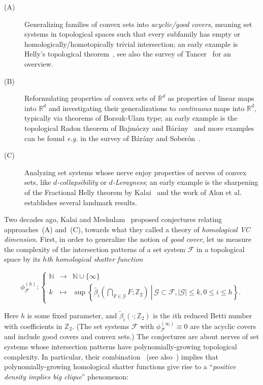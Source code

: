 \documentclass[a4paper,UKenglish,thm-restate]{article}
\newcommand{\R}{\mathbb{R}}
\newcommand{\Z}{\mathbb{Z}}
\newcommand{\F}{\mathcal{F}}
\newcommand{\G}{\mathcal{G}}
\newcommand{\defn}[1]{\emph{\color{violet}#1}}
\newcommand{\pth}[1]{\left(#1\right)}
\begin{document}
\begin{description}
\item[(A)] Generalizing families of convex sets into \emph{acyclic/good covers}, meaning set systems in topological spaces such that every subfamily has empty or homologically/homotopically trivial intersection; an early example is Helly's topological theorem~\cite{helly1930systeme}, see also the survey of Tancer~\cite{tancer2012intersection} for an overview.\medskip

\item[(B)] Reformulating properties of convex sets of $\R^d$ as properties of linear maps into $\R^d$ and investigating their generalizations to \emph{continuous} maps into $\R^d$, typically via theorems of Borsuk-Ulam type; an early example is the topological Radon theorem of Bajmóczy and Bárány~\cite{bajmoczy1979common} and more examples can be found \emph{e.g.} in the survey of Bárány and Soberón~\cite{barany2018tverberg}.\medskip

\item[(C)] Analyzing set systems whose nerve enjoy properties of nerves of convex sets, like \emph{$d$-collapsibility} or \emph{$d$-Lerayness}; an early example is the sharpening of the Fractional Helly theorem by Kalai~\cite{kalai1984intersection} and the work of Alon et al.~\cite{transversal-hypergraph} establishes several landmark results.
\end{description}

\noindent
Two decades ago, Kalai and Meshulam~\cite{KM} proposed conjectures relating approaches~(A) and~(C), towards what they called a theory of \emph{homological VC dimension}. First, in order to generalize the notion of \emph{good cover}, let us measure the complexity of the intersection patterns of a set system $\F$ in a topological space by its \defn{$h$th homological shatter function}

\begin{equation}\label{eq:homshat}
  \phi_{\F}^{(h)}\colon\left\{\begin{array}{rcl}
        \mathbb{N} & \rightarrow & \mathbb{N} \cup \{\infty\} \\
         k& \mapsto & \sup \left\{\left.\tilde{\beta_i}\pth{\bigcap\limits_{F\in \mathcal{G}} F;\Z_2} \ \right| \ \G\subset \F, |\G|\leq k, 0\leq i\leq h\right\}.
    \end{array}\right.
\end{equation}

\noindent
Here $h$ is some fixed parameter, and $\tilde\beta_i(\cdot;\Z_2)$ is the $i$th reduced Betti number with coefficients in $\Z_2$. (The set systems $\F$ with $\phi_{\F}^{(\infty)} \equiv 0$ are the acyclic covers and include good covers and convex sets.) The  conjectures are about nerves of set systems whose intersection patterns have polynomially-growing topological complexity. In particular, their combination~\cite[Conjectures~6~and~7]{KM} (see also~\cite[Conjecture~1.9]{steppingUp}) implies that polynomially-growing homological shatter functions give rise to a ``\emph{positive density implies big clique}'' phenomenon:
\end{document}
